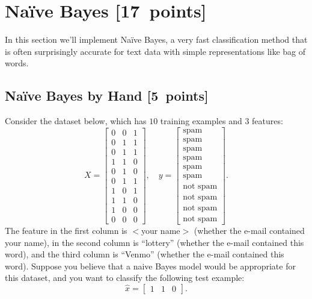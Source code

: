 \documentclass{article}
\newcommand\pts[1]{\textcolor{pointscolour}{[#1~points]}}
\begin{document}
    \clearpage
    \section{Na\"ive Bayes \pts{17}}

    In this section we'll implement Na\"ive Bayes, a very fast classification method that is often surprisingly accurate for text data with simple representations like bag of words.


    \subsection{Na\"ive Bayes by Hand \pts{5}}

    Consider the dataset below, which has $10$ training examples and $3$ features:
    \[
    X = \begin{bmatrix}
        0 & 0 & 1\\
        0 & 1 & 1\\
        0 & 1 & 1\\
        1 & 1 & 0\\
        0 & 1 & 0\\
        0 & 1 & 1\\
        1 & 0 & 1\\
        1 & 1 & 0\\
        1 & 0 & 0\\
        0 & 0 & 0
    \end{bmatrix},
    \quad y = \begin{bmatrix}
        \text{spam}\\
        \text{spam}\\
        \text{spam}\\
        \text{spam}\\
        \text{spam}\\
        \text{spam}\\
        \text{not spam}\\
        \text{not spam}\\
        \text{not spam}\\
        \text{not spam}
    \end{bmatrix}.
    \]
    The feature in the first column is $<$your name$>$ (whether the e-mail contained your name), in the second column is ``lottery'' (whether the e-mail contained this word), and the third column is ``Venmo'' (whether the e-mail contained this word).
    Suppose you believe that a naive Bayes model would be appropriate for this dataset, and you want to classify the following test example:
    \[
    \hat{x} = \begin{bmatrix}1 & 1 & 0\end{bmatrix}.
    \]
\end{document}
